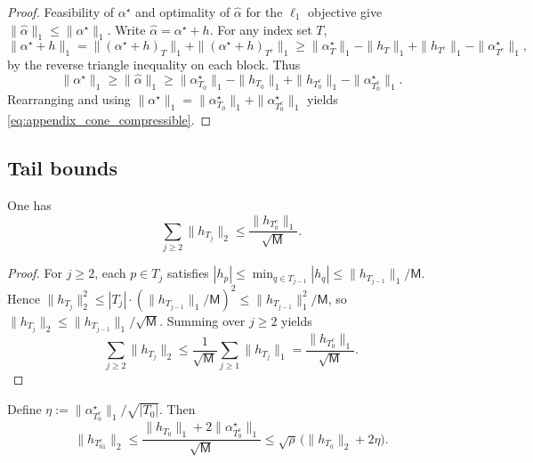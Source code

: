 \begin{proof}
Feasibility of $\alpha^\star$ and optimality of $\widehat{\alpha}$ for the $\ell_1$ objective give $\|\widehat{\alpha}\|_1\le \|\alpha^\star\|_1$.
Write $\widehat{\alpha}=\alpha^\star+h$.
For any index set $T$,
\[
  \|\alpha^\star+h\|_1
  =
  \|(\alpha^\star+h)_T\|_1 + \|(\alpha^\star+h)_{T^c}\|_1
  \ge
  \|\alpha^\star_T\|_1 - \|h_T\|_1 + \|h_{T^c}\|_1 - \|\alpha^\star_{T^c}\|_1,
\]
by the reverse triangle inequality on each block.
Thus
\[
  \|\alpha^\star\|_1
  \ge
  \|\widehat{\alpha}\|_1
  \ge
  \|\alpha^\star_{T_0}\|_1 - \|h_{T_0}\|_1 + \|h_{T_0^c}\|_1 - \|\alpha^\star_{T_0^c}\|_1.
\]
Rearranging and using $\|\alpha^\star\|_1=\|\alpha^\star_{T_0}\|_1+\|\alpha^\star_{T_0^c}\|_1$ yields \eqref{eq:appendix_cone_compressible}.
\end{proof}

\subsection{Tail bounds}

\begin{lemma}
\label{lem:appendix_sum_tail}
One has
\begin{equation}
  \sum_{j\ge 2}\|h_{T_j}\|_2 \le \frac{\|h_{T_0^c}\|_1}{\sqrt{\mathsf{M}}}.
  \label{eq:appendix_sum_tail_blocks}
\end{equation}
\end{lemma}

\begin{proof}
For $j\ge 2$, each $p\in T_j$ satisfies $|h_p|\le \min_{q\in T_{j-1}}|h_q|\le \|h_{T_{j-1}}\|_1/\mathsf{M}$.
Hence $\|h_{T_j}\|_2^2\le |T_j|\cdot (\|h_{T_{j-1}}\|_1/\mathsf{M})^2\le \|h_{T_{j-1}}\|_1^2/\mathsf{M}$, so $\|h_{T_j}\|_2\le \|h_{T_{j-1}}\|_1/\sqrt{\mathsf{M}}$.
Summing over $j\ge 2$ yields
\[
  \sum_{j\ge 2}\|h_{T_j}\|_2
  \le
  \frac{1}{\sqrt{\mathsf{M}}}\sum_{j\ge 1}\|h_{T_j}\|_1
  =
  \frac{\|h_{T_0^c}\|_1}{\sqrt{\mathsf{M}}}.
\]
\end{proof}

\begin{lemma}
\label{lem:appendix_tail_T01c}
Define $\eta:=\|\alpha^\star_{T_0^c}\|_1/\sqrt{|T_0|}$.
Then
\begin{equation}
  \|h_{T_{01}^c}\|_2 \le \frac{\|h_{T_0}\|_1 + 2\|\alpha^\star_{T_0^c}\|_1}{\sqrt{\mathsf{M}}}
  \le
  \sqrt{\rho}\,\bigl(\|h_{T_0}\|_2 + 2\eta\bigr).
  \label{eq:appendix_tail_T01c_bound}
\end{equation}
\end{lemma}

